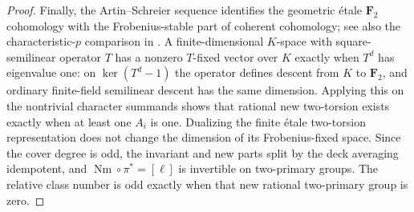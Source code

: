 \documentclass[11pt,a4paper]{article}
\begin{document}
\begin{proof}
Finally, the Artin--Schreier sequence identifies the geometric
\'etale $\mathbf F_2$ cohomology with the Frobenius-stable part
of coherent cohomology; see also the characteristic-$p$
comparison in \cite[Section 9]{MilneJac}. A finite-dimensional
$K$-space with square-semilinear operator $T$ has a nonzero
$T$-fixed vector over $K$ exactly when $T^d$ has eigenvalue one:
on $\ker(T^d-1)$ the operator defines descent from $K$ to
$\mathbf F_2$, and ordinary finite-field semilinear descent
has the same dimension. Applying this on the nontrivial
character summands shows that rational new two-torsion exists
exactly when at least one $A_i$ is one. Dualizing the finite
\'etale two-torsion representation does not change the dimension
of its Frobenius-fixed space. Since the cover degree is odd,
the invariant and new parts split by the deck averaging
idempotent, and $\operatorname{Nm}\circ\pi^*=[\ell]$ is invertible
on two-primary groups. The relative class number is odd
exactly when that new rational two-primary group is zero.
\end{proof}
\end{document}
